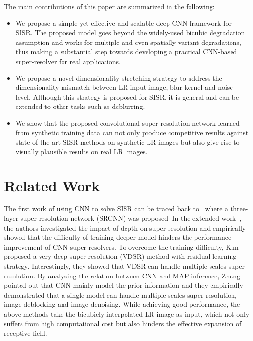 \documentclass[10pt,twocolumn,letterpaper]{article}
\begin{document}
The main contributions of this paper are summarized in the following:
\begin{itemize}
  \item We propose a simple yet effective and scalable deep CNN framework for SISR. The proposed model goes beyond the widely-used bicubic degradation assumption and works for multiple and even spatially variant degradations, thus making a substantial step towards developing a practical CNN-based super-resolver for real applications.

  \item  We propose a novel dimensionality stretching strategy to address the dimensionality mismatch between LR input image, blur kernel and noise level. Although this strategy is proposed for SISR, it is general and can be extended to other tasks such as deblurring.

  \item We show that the proposed convolutional super-resolution network learned from synthetic training data can not only produce competitive results against state-of-the-art SISR methods on synthetic LR images but also give rise to visually plausible results on real LR images.

\end{itemize}





\section{Related Work}

The first work of using CNN to solve SISR can be traced back to~\cite{dong2014learning} where a three-layer super-resolution network (SRCNN) was proposed.
In the extended work~\cite{dong2016image}, the authors investigated the impact of depth on super-resolution and empirically showed that the difficulty
of training deeper model hinders the performance improvement of CNN super-resolvers.
To overcome the training difficulty, Kim~\etal~\cite{kim2015accurate} proposed a very deep super-resolution (VDSR)
method with residual learning strategy. Interestingly, they showed that VDSR can handle multiple scales super-resolution.
By analyzing the relation between CNN and MAP inference, Zhang~\etal~\cite{zhang2017beyond} pointed out that CNN mainly model the prior information and they empirically demonstrated that a single model can handle multiple scales super-resolution, image deblocking and image denoising.
While achieving good performance, the above methods take the bicubicly interpolated LR image as input, which not only suffers from high computational cost but also hinders the effective expansion of receptive field.
\end{document}
